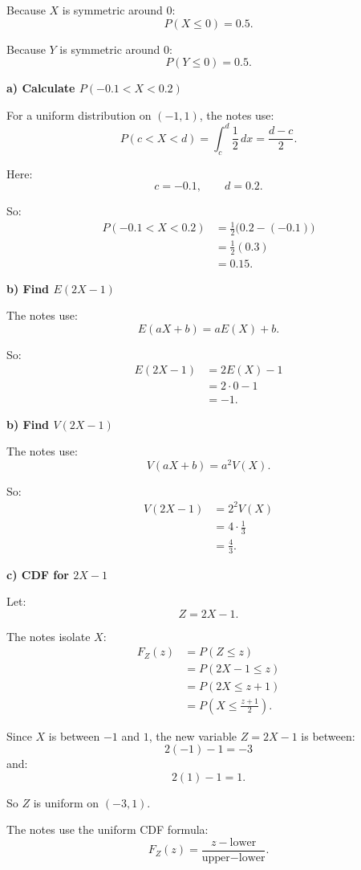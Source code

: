 \documentclass[10pt]{article}
\begin{document}
Because \(X\) is symmetric around \(0\):
\[
P(X\le 0)=0.5.
\]

Because \(Y\) is symmetric around \(0\):
\[
P(Y\le 0)=0.5.
\]

\textbf{a) Calculate \(P(-0.1<X<0.2)\)}

For a uniform distribution on \((-1,1)\), the notes
use:
\[
P(c<X<d)
=
\int_c^d \frac12\,dx
=
\frac{d-c}{2}.
\]

Here:
\[
c=-0.1,
\qquad
d=0.2.
\]

So:
\begin{align*}
P(-0.1<X<0.2)
&=
\frac12
\bigl(0.2-(-0.1)\bigr)
\\[2mm]
&=
\frac12(0.3)
\\[2mm]
&=
0.15.
\end{align*}

\textbf{b) Find \(E(2X-1)\)}

The notes use:
\[
E(aX+b)=aE(X)+b.
\]

So:
\begin{align*}
E(2X-1)
&=
2E(X)-1
\\[2mm]
&=
2\cdot 0-1
\\[2mm]
&=
-1.
\end{align*}

\textbf{b) Find \(V(2X-1)\)}

The notes use:
\[
V(aX+b)=a^2V(X).
\]

So:
\begin{align*}
V(2X-1)
&=
2^2V(X)
\\[2mm]
&=
4\cdot \frac13
\\[2mm]
&=
\frac43.
\end{align*}

\textbf{c) CDF for \(2X-1\)}

Let:
\[
Z=2X-1.
\]

The notes isolate \(X\):
\begin{align*}
F_Z(z)
&=
P(Z\le z)
\\[2mm]
&=
P(2X-1\le z)
\\[2mm]
&=
P(2X\le z+1)
\\[2mm]
&=
P\left(X\le \frac{z+1}{2}\right).
\end{align*}

Since \(X\) is between \(-1\) and \(1\), the new
variable \(Z=2X-1\) is between:
\[
2(-1)-1=-3
\]
and:
\[
2(1)-1=1.
\]

So \(Z\) is uniform on \((-3,1)\).

The notes use the uniform CDF formula:
\[
F_Z(z)
=
\frac{z-\text{lower}}{\text{upper}-\text{lower}}.
\]
\end{document}
